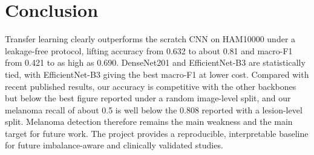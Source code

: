 \documentclass[conference]{IEEEtran}
\begin{document}
\section{Conclusion}
Transfer learning clearly outperforms the scratch CNN on HAM10000 under a leakage-free protocol, lifting accuracy from 0.632 to about 0.81 and macro-F1 from 0.421 to as high as 0.690. DenseNet201 and EfficientNet-B3 are statistically tied, with EfficientNet-B3 giving the best macro-F1 at lower cost. Compared with recent published results, our accuracy is competitive with the other backbones but below the best figure reported under a random image-level split, and our melanoma recall of about 0.5 is well below the 0.808 reported with a lesion-level split. Melanoma detection therefore remains the main weakness and the main target for future work. The project provides a reproducible, interpretable baseline for future imbalance-aware and clinically validated studies.



\end{document}

